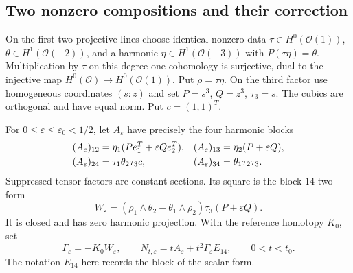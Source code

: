 \documentclass[11pt]{amsart}
\theoremstyle{definition}
\theoremstyle{remark}
\newcommand{\cO}{\mathcal O}
\begin{document}
\subsection{Two nonzero compositions and their correction}
On the first two projective lines choose identical nonzero data
$\tau\in H^0(\cO(1))$, $\theta\in H^1(\cO(-2))$, and a harmonic
$\eta\in H^1(\cO(-3))$ with $P(\tau\eta)=\theta$.
Multiplication by $\tau$ on this degree-one cohomology is surjective,
dual to the injective map $H^0(\cO)\to H^0(\cO(1))$.
Put $\rho=\tau\eta$. On the third factor use homogeneous coordinates
$(s:z)$ and set $P=s^3$, $Q=z^3$, $\tau_3=s$. The cubics are
orthogonal and have equal norm. Put $c=(1,1)^T$.

For $0\le\varepsilon\le\varepsilon_0<1/2$, let $A_\varepsilon$
have precisely the four harmonic blocks
\begin{align}
 (A_\varepsilon)_{12}&=\eta_1(Pe_1^T+\varepsilon Qe_2^T),&
 (A_\varepsilon)_{13}&=\eta_2(P+\varepsilon Q),\notag\\
 (A_\varepsilon)_{24}&=\tau_1\theta_2\tau_3c,&
 (A_\varepsilon)_{34}&=\theta_1\tau_2\tau_3.\label{eq:fixed-family}
\end{align}
Suppressed tensor factors are constant sections. Its square is the
block-$14$ two-form
\begin{equation}\label{eq:fixed-curvature}
 W_\varepsilon=(\rho_1\wedge\theta_2-\theta_1\wedge\rho_2)
                  \tau_3(P+\varepsilon Q).
\end{equation}
It is closed and has zero harmonic projection. With the reference
homotopy $K_0$, set
\begin{equation}\label{eq:fixed-integrable}
 \Gamma_\varepsilon=-K_0W_\varepsilon,\qquad
 N_{t,\varepsilon}=tA_\varepsilon+t^2\Gamma_\varepsilon E_{14},
 \qquad 0<t<t_0.
\end{equation}
The notation $E_{14}$ here records the block of the scalar form.
\end{document}
